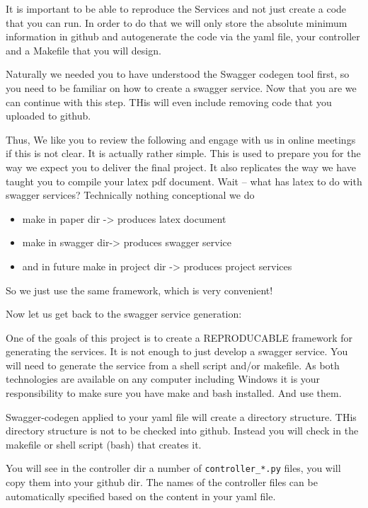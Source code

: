 \begin{exercise}
It is important to be able to reproduce the Services and not just
create a code that you can run. In order to do that we will only store
the absolute minimum information in github and autogenerate the code
via the yaml file, your controller and a Makefile that you will
design.

Naturally we needed you to have understood the Swagger codegen tool
first, so you need to be familiar on how to create a swagger service.
Now that you are we can continue with this step. THis will even
include removing code that you uploaded to github.

Thus, We like you to review the following and engage with us in online
meetings if this is not clear. It is actually rather simple. This is
used to prepare you for the way we expect you to deliver the final
project. It also replicates the way we have taught you to compile your
latex pdf document. Wait -- what has latex to do with swagger services?
Technically nothing conceptional we do

 
\begin{itemize}
\item make in paper dir -> produces latex document

\item make in swagger dir-> produces swagger service

\item and in future make in project dir -> produces project services
\end{itemize}
 

So we just use the same framework, which is very convenient!

Now let us get back to the swagger service generation:
 
One of the goals of this project is to create a REPRODUCABLE framework
for generating the services. It is not enough to just develop a
swagger service. You will need to generate the service from a shell
script and/or makefile. As both technologies are available on any
computer including Windows it is your responsibility to make sure you
have make and bash installed. And use them.

Swagger-codegen applied to your yaml file will create a directory
structure. THis directory structure is not to be checked into
github. Instead you will check in the makefile or shell script (bash)
that creates it.

You will see in the controller dir a number of \verb|controller_*.py|
files, you will copy them into your github dir. The names of the
controller files can be automatically specified based on the content
in your yaml file.


\end{exercise}
